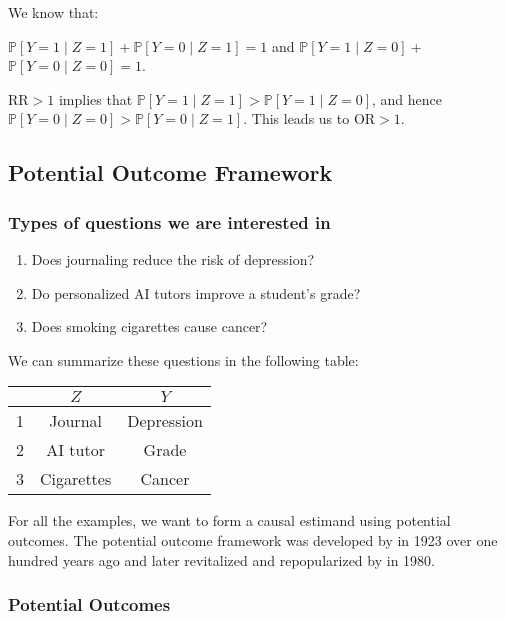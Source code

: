 We know that:

\begin{center}
    $\mathbb{P}[Y = 1 \mid Z = 1] + \mathbb{P}[Y = 0 \mid Z = 1] = 1$ and
    $\mathbb{P}[Y = 1 \mid Z = 0] +$ $\mathbb{P}[Y = 0 \mid Z = 0] = 1$. 
\end{center}    
    $\mathrm{RR} > 1$ implies that $\mathbb{P}[Y = 1 \mid Z = 1] > \mathbb{P}[Y = 1 \mid Z = 0]$, and hence $\mathbb{P}[Y = 0 \mid Z = 0] > \mathbb{P}[Y = 0 \mid Z = 1]$. This leads us to $\mathrm{OR} > 1$.

\subsection{Potential Outcome Framework}\label{sec:pof}

\subsubsection{Types of questions we are interested in}

\begin{enumerate}
    \item Does journaling reduce the risk of depression?
    \item Do personalized AI tutors improve a student's grade?
    \item Does smoking cigarettes cause cancer?
\end{enumerate}

We can summarize these questions in the following table: \par
\begin{center}
\begin{tabular}{ccc}
  \hline
  & \textbf{$Z$} & \textbf{$Y$} \\
  \hline
  1 & Journal & Depression \\
  \hline
  2 & AI tutor & Grade  \\
  \hline
  3 & Cigarettes & Cancer  \\
  \hline
\end{tabular}
\end{center}

For all the examples, we want to form a causal estimand using potential outcomes. The potential outcome framework was developed by \cite{neyman1923} in 1923 over one hundred years ago and later revitalized and repopularized by \cite{rubin1980} in 1980. 

\subsubsection{Potential Outcomes}

